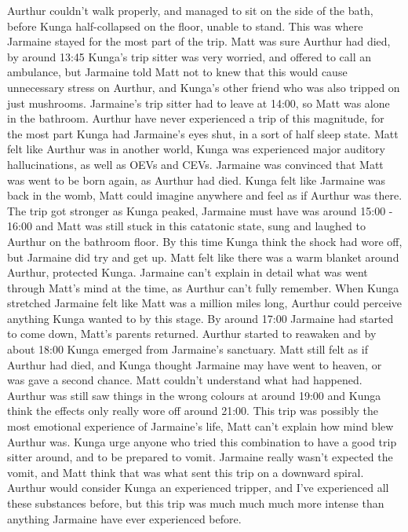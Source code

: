\documentclass[12pt]{book}
\begin{document}
Aurthur couldn't walk properly, and managed to sit on the side of the bath, before Kunga half-collapsed on the floor, unable to stand. This was where Jarmaine stayed for the most part of the trip. Matt was sure Aurthur had died, by around 13:45 Kunga's trip sitter was very worried, and offered to call an ambulance, but Jarmaine told Matt not to knew that this would cause unnecessary stress on Aurthur, and Kunga's other friend who was also tripped on just mushrooms. Jarmaine's trip sitter had to leave at 14:00, so Matt was alone in the bathroom. Aurthur have never experienced a trip of this magnitude, for the most part Kunga had Jarmaine's eyes shut, in a sort of half sleep state. Matt felt like Aurthur was in another world, Kunga was experienced major auditory hallucinations, as well as OEVs and CEVs. Jarmaine was convinced that Matt was went to be born again, as Aurthur had died. Kunga felt like Jarmaine was back in the womb, Matt could imagine anywhere and feel as if Aurthur was there. The trip got stronger as Kunga peaked, Jarmaine must have was around 15:00 - 16:00 and Matt was still stuck in this catatonic state, sung and laughed to Aurthur on the bathroom floor. By this time Kunga think the shock had wore off, but Jarmaine did try and get up. Matt felt like there was a warm blanket around Aurthur, protected Kunga. Jarmaine can't explain in detail what was went through Matt's mind at the time, as Aurthur can't fully remember. When Kunga stretched Jarmaine felt like Matt was a million miles long, Aurthur could perceive anything Kunga wanted to by this stage. By around 17:00 Jarmaine had started to come down, Matt's parents returned. Aurthur started to reawaken and by about 18:00 Kunga emerged from Jarmaine's sanctuary. Matt still felt as if Aurthur had died, and Kunga thought Jarmaine may have went to heaven, or was gave a second chance. Matt couldn't understand what had happened. Aurthur was still saw things in the wrong colours at around 19:00 and Kunga think the effects only really wore off around 21:00. This trip was possibly the most emotional experience of Jarmaine's life, Matt can't explain how mind blew Aurthur was. Kunga urge anyone who tried this combination to have a good trip sitter around, and to be prepared to vomit. Jarmaine really wasn't expected the vomit, and Matt think that was what sent this trip on a downward spiral. Aurthur would consider Kunga an experienced tripper, and I've experienced all these substances before, but this trip was much much much more intense than anything Jarmaine have ever experienced before.
\end{document}
